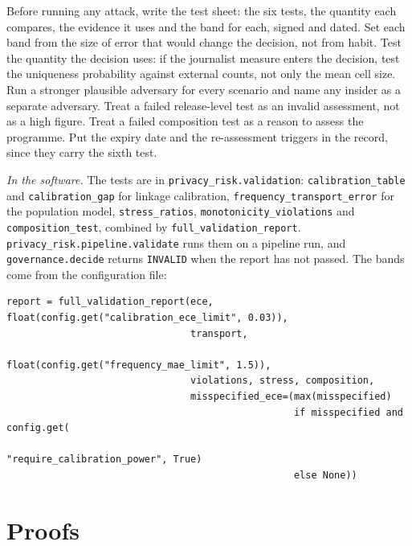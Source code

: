 \begin{inpractice}
\setlength{\emergencystretch}{3em}%
Before running any attack, write the test sheet: the six tests, the quantity each
compares, the evidence it uses and the band for each, signed and dated. Set each
band from the size of error that would change the decision, not from habit. Test
the quantity the decision uses: if the journalist measure enters the decision, test
the uniqueness probability against external counts, not only the mean cell size.
Run a stronger plausible adversary for every scenario and name any insider as a
separate adversary. Treat a failed release-level test as an invalid assessment, not
as a high figure. Treat a failed composition test as a reason to assess the
programme. Put the expiry date and the re-assessment triggers in the record, since
they carry the sixth test.

\smallskip\noindent\textit{In the software.} The tests are in
\texttt{privacy\_\allowbreak{}risk.\allowbreak{}validation}: \texttt{calibration\_\allowbreak{}table} and
\texttt{calibration\_\allowbreak{}gap} for linkage calibration,
\texttt{frequency\_\allowbreak{}transport\_\allowbreak{}error} for the population model,
\texttt{stress\_\allowbreak{}ratios}, \texttt{monotonicity\_\allowbreak{}violations} and
\texttt{composition\_\allowbreak{}test}, combined by \texttt{full\_\allowbreak{}validation\_\allowbreak{}report}.
\texttt{privacy\_\allowbreak{}risk.\allowbreak{}pipeline.\allowbreak{}validate} runs them on a pipeline run, and
\texttt{governance.\allowbreak{}decide} returns \texttt{INVALID} when the report has not passed.
The bands come from the configuration file:
\begin{lstlisting}
report = full_validation_report(ece, float(config.get("calibration_ece_limit", 0.03)),
                                transport,
                                float(config.get("frequency_mae_limit", 1.5)),
                                violations, stress, composition,
                                misspecified_ece=(max(misspecified)
                                                  if misspecified and config.get(
                                                      "require_calibration_power", True)
                                                  else None))
\end{lstlisting}
\end{inpractice}

\section{Proofs}

